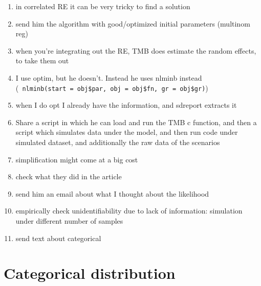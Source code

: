 \documentclass{article}
\begin{document}
\begin{enumerate}
\item in correlated RE it can be very tricky to find a solution
\item {\color{red} send him the algorithm with good/optimized initial parameters (multinom reg)}
\item when you're integrating out the RE, TMB does estimate the random effects, to take them out
\item I use optim, but he doesn't. Instead he uses nlminb instead \\ (\verb| nlminb(start = obj$par, obj = obj$fn, gr = obj$gr)|)
\item when I do opt I already have the information, and sdreport extracts it
\item {\color{red} Share a script in which he can load and run the TMB c function, and then a script which simulates data under the model, and then run code under simulated dataset, and additionally the raw data of the scenarios}
\item simplification might come at a big cost
\item check what they did in the article
\item send him an email about what I thought about the likelihood
\item empirically check unidentifiability due to lack of information: simulation under different number of samples
\item {\color{red} send text about categorical}
\end{enumerate}

\section{Categorical distribution}
\end{document}
